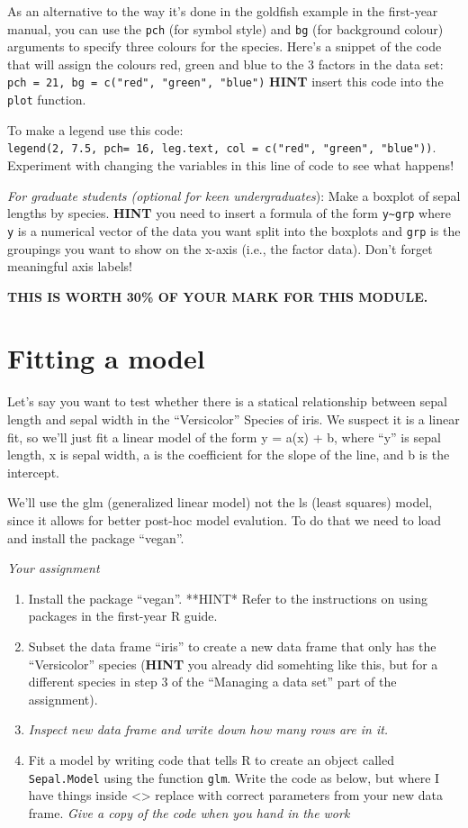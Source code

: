 \documentclass[]{book}
\begin{document}
As an alternative to the way it's done in the goldfish example in the first-year manual, you can use the \texttt{pch} (for symbol style) and \texttt{bg} (for background colour) arguments to specify three colours for the species. Here's a snippet of the code that will assign the colours red, green and blue to the 3 factors in the data set: \texttt{pch\ =\ 21,\ bg\ =\ c("red",\ "green",\ "blue")} \textbf{HINT} insert this code into the \texttt{plot} function.

To make a legend use this code: \texttt{legend(2,\ 7.5,\ pch=\ 16,\ leg.text,\ col\ =\ c("red",\ "green",\ "blue"))}. Experiment with changing the variables in this line of code to see what happens!

\emph{For graduate students (optional for keen undergraduates}): Make a boxplot of sepal lengths by species. \textbf{HINT} you need to insert a formula of the form \texttt{y\textasciitilde{}grp} where \texttt{y} is a numerical vector of the data you want split into the boxplots and \texttt{grp} is the groupings you want to show on the x-axis (i.e., the factor data). Don't forget meaningful axis labels!

\textbf{THIS IS WORTH 30\% OF YOUR MARK FOR THIS MODULE.}

\hypertarget{fitting-a-model}{%
\chapter{Fitting a model}\label{fitting-a-model}}

Let's say you want to test whether there is a statical relationship between sepal length and sepal width in the ``Versicolor'' Species of iris. We suspect it is a linear fit, so we'll just fit a linear model of the form y = a(x) + b, where ``y'' is sepal length, x is sepal width, a is the coefficient for the slope of the line, and b is the intercept.

We'll use the glm (generalized linear model) not the ls (least squares) model, since it allows for better post-hoc model evalution. To do that we need to load and install the package ``vegan''.

\emph{Your assignment}

\begin{enumerate}
\def\labelenumi{\arabic{enumi}.}
\item
  Install the package ``vegan''. **HINT* Refer to the instructions on using packages in the first-year R guide.
\item
  Subset the data frame ``iris'' to create a new data frame that only has the ``Versicolor'' species (\textbf{HINT} you already did somehting like this, but for a different species in step 3 of the ``Managing a data set'' part of the assignment).
\item
  \emph{Inspect new data frame and write down how many rows are in it.}
\item
  Fit a model by writing code that tells R to create an object called \texttt{Sepal.Model} using the function \texttt{glm}. Write the code as below, but where I have things inside \textless{}\textgreater{} replace with correct parameters from your new data frame. \emph{Give a copy of the code when you hand in the work}
\end{enumerate}
\end{document}
